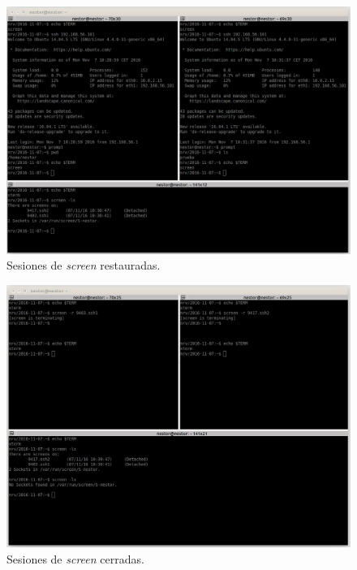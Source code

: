 \documentclass[a4paper,titlepage,12pt]{scrartcl}	%
\numberwithin{figure}{section} %
\numberwithin{table}{section} %
\begin{document}
	\begin{figure}[H]
		\centering
		\includegraphics[scale=0.31]{./Imagenes/O1-3.png}
		\caption[Sesiones de \textit{screen} restauradas.]{Sesiones de \textit{screen} restauradas.}
		\label{O1-3}
	\end{figure}
	
	\begin{figure}[H]
		\centering
		\includegraphics[scale=0.31]{./Imagenes/O1-4.png}
		\caption[Sesiones de \textit{screen} cerradas.]{Sesiones de \textit{screen} cerradas.}
		\label{O1-4}
	\end{figure}
	
\end{document}
